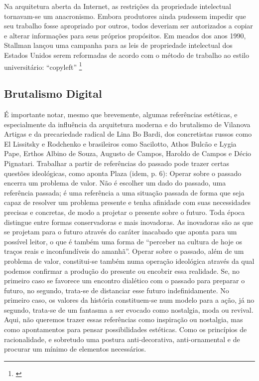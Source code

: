 {\begin{citacao}
Na arquitetura aberta da Internet, as restrições da propriedade intelectual tornavam-se um anacronismo. Embora produtores ainda pudessem impedir que seu trabalho fosse apropriado por outros, todos deveriam ser autorizados a copiar e alterar informações para seus próprios propósitos. Em meados dos anos 1990, Stallman lançou uma campanha para as leis de propriedade intelectual dos Estados Unidos serem reformadas de acordo com o método de trabalho ao estilo universitário: “copyleft” \footnote{\cite[368]{Barbrook2009}} \citeyear{Barbrook2009}
\end{citacao}




\subsection{Brutalismo Digital}
É importante notar, mesmo que brevemente, algumas referências  estéticas, e especialmente da influência da arquitetura moderna e do brutalismo de Vilanova Artigas e da precariedade radical de Lina Bo Bardi, dos concretistas russos como El Lissitsky e Rodchenko e brasileiros como Sacilotto, Athos Bulcão e Lygia Pape, Erthos Albino de Souza, Augusto de Campos, Haroldo de Campos e Décio Pignatari. Trabalhar a partir de  referências do passado pode trazer certas questões ideológicas, como aponta Plaza (idem, p. 6):
Operar sobre o passado encerra um problema de valor. Não é escolher um dado do passado, uma referência passada; é uma referência a uma situação passada de forma que seja capaz de resolver um problema presente e tenha afinidade com suas necessidades precisas e concretas, de modo a projetar o presente sobre o futuro. Toda época distingue entre formas conservadoras e mais inovadoras. As inovadoras são as que se projetam para o futuro através do caráter inacabado que aponta para um possível leitor, o que é também uma forma de ``perceber na cultura de hoje os traços reais e inconfundíveis do amanhã''. Operar sobre o passado, além de um problema de valor, constitui-se também numa operação ideológica através da qual podemos confirmar a produção do presente ou encobrir essa realidade. Se, no primeiro caso se favorece um encontro dialético com o passado para preparar o futuro, no segundo, trata-se de distanciar esse futuro indefinidamente. No primeiro caso, os valores da história constituem-se num modelo para a ação, já no segundo, trata-se de um fantasma a ser evocado como nostalgia, moda ou revival.
Aqui, não queremos trazer essas referências como inspiração ou nostalgia, mas como apontamentos para pensar possibilidades estéticas. Como os princípios de racionalidade,  e sobretudo uma postura anti-decorativa, anti-ornamental e de procurar um mínimo de elementos necessários. 

}
